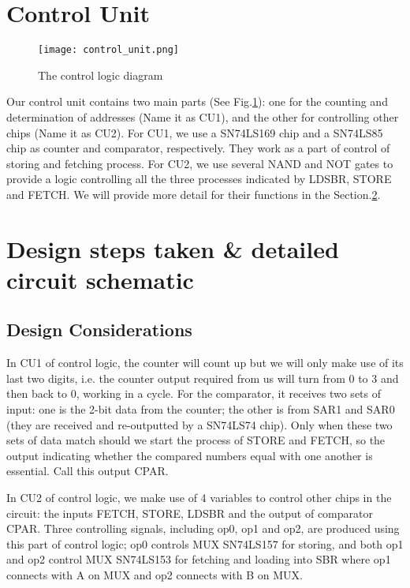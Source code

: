 \documentclass[12pt]{article}
\begin{document}
\section{Control Unit}
\begin{figure}[h]
    \centering
    \texttt{[image: control\_unit.png]}
    \caption{The control logic diagram}
    \label{control logic}
\end{figure}
Our control unit contains two main parts (See Fig.\ref{control logic}): one for the counting and determination of addresses (Name it as CU1), and the other for controlling other chips (Name it as CU2). For CU1, we use a SN74LS169 chip and a SN74LS85 chip as counter and comparator, respectively. They work as a part of control of storing and fetching process. For CU2, we use several NAND and NOT gates to provide a logic controlling all the three processes indicated by LDSBR, STORE and FETCH. We will provide more detail for their functions in the Section.\ref{part5}.

\section{Design steps taken \& detailed circuit schematic}
\label{part5}
\subsection{Design Considerations}
In CU1 of control logic, the counter will count up but we will only make use of its last two digits, i.e. the counter output required from us will turn from 0 to 3 and then back to 0, working in a cycle. For the comparator, it receives two sets of input: one is the 2-bit data from the counter; the other is from SAR1 and SAR0 (they are received and re-outputted by a SN74LS74 chip). Only when these two sets of data match should we start the process of STORE and FETCH, so the output indicating whether the compared numbers equal with one another is essential. Call this output CPAR. 

In CU2 of control logic, we make use of 4 variables to control other chips in the circuit: the inputs FETCH, STORE, LDSBR and the output of comparator CPAR. Three controlling signals, including op0, op1 and op2, are produced using this part of control logic; op0 controls MUX SN74LS157 for storing, and both op1 and op2 control MUX SN74LS153 for fetching and loading into SBR where op1 connects with A on MUX and op2 connects with B on MUX. 
\end{document}
